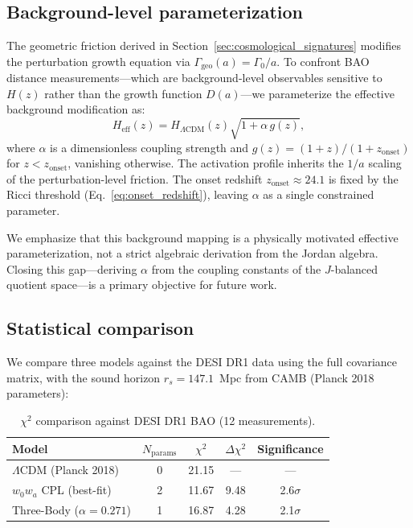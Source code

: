 \documentclass[aps,prd,twocolumn,superscriptaddress,nofootinbib]{revtex4-2}
\theoremstyle{definition}
\theoremstyle{remark}
\begin{document}
\subsection{Background-level parameterization}

The geometric friction derived in Section~\ref{sec:cosmological_signatures}
modifies the perturbation growth equation via
$\Gamma_{\mathrm{geo}}(a) = \Gamma_0/a$. To confront BAO distance
measurements---which are background-level observables sensitive to $H(z)$
rather than the growth function $D(a)$---we parameterize the effective
background modification as:
\begin{equation}
H_{\mathrm{eff}}(z) = H_{\Lambda\mathrm{CDM}}(z)
\sqrt{1 + \alpha\, g(z)},
\label{eq:H_effective}
\end{equation}
where $\alpha$ is a dimensionless coupling strength and $g(z) = (1+z) /
(1+z_{\mathrm{onset}})$ for $z < z_{\mathrm{onset}}$, vanishing otherwise.
The activation profile inherits the $1/a$ scaling of the perturbation-level
friction. The onset redshift $z_{\mathrm{onset}} \approx 24.1$ is fixed by
the Ricci threshold (Eq.~\eqref{eq:onset_redshift}), leaving $\alpha$ as a
single constrained parameter.

We emphasize that this background mapping is a physically motivated
effective parameterization, not a strict algebraic derivation from the
Jordan algebra. Closing this gap---deriving $\alpha$ from the coupling
constants of the $J$-balanced quotient space---is a primary objective
for future work.

\subsection{Statistical comparison}

We compare three models against the DESI DR1 data using the full
covariance matrix, with the sound horizon $r_s = 147.1$~Mpc from CAMB
(Planck 2018 parameters):

\begin{table}[h]
\centering
\caption{$\chi^2$ comparison against DESI DR1 BAO (12 measurements).}
\label{tab:chi2}
\begin{tabular}{lcccc}
\toprule
Model & $N_{\mathrm{params}}$ & $\chi^2$ & $\Delta\chi^2$ & Significance \\
\midrule
$\Lambda$CDM (Planck 2018) & 0 & 21.15 & --- & --- \\
$w_0 w_a$ CPL (best-fit) & 2 & 11.67 & 9.48 & 2.6$\sigma$ \\
Three-Body ($\alpha = 0.271$) & 1 & 16.87 & 4.28 & 2.1$\sigma$ \\
\bottomrule
\end{tabular}
\end{table}
\end{document}
